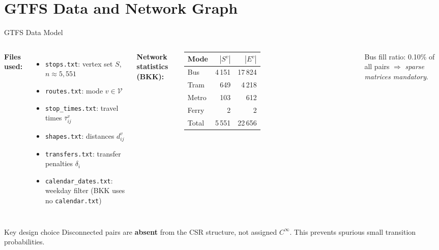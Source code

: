\documentclass[aspectratio=169,12pt]{beamer}
\begin{document}
\section{GTFS Data and Network Graph}
\begin{frame}{GTFS Data Model}
\begin{columns}[T]
\textbf{Files used:}
\begin{itemize}
  \item \texttt{stops.txt}: vertex set $S$, $n\approx5{,}551$
  \item \texttt{routes.txt}: mode $v\in\mathcal{V}$
  \item \texttt{stop\_times.txt}: travel times $\bar\tau^v_{ij}$
  \item \texttt{shapes.txt}: distances $d^v_{ij}$
  \item \texttt{transfers.txt}: transfer penalties $\delta_i$
  \item \texttt{calendar\_dates.txt}: weekday filter (BKK uses no \texttt{calendar.txt})
\end{itemize}

\textbf{Network statistics (BKK):}
\vspace{4pt}
\begin{tabular}{lrr}
\toprule
Mode & $|S^v|$ & $|E^v|$ \\
\midrule
Bus        & 4\,151 & 17\,824 \\
Tram       &   649  &  4\,218 \\
Metro      &   103  &    612  \\
Ferry      &     2  &      2  \\
\midrule
Total      & 5\,551 & 22\,656 \\
\bottomrule
\end{tabular}

\vspace{8pt}
Bus fill ratio: 0.10\% of all pairs $\Rightarrow$ \emph{sparse matrices mandatory}.
\end{columns}
\vspace{6pt}
\begin{alertblock}{Key design choice}
Disconnected pairs are \textbf{absent} from the CSR structure, not assigned $C^\infty$.
This prevents spurious small transition probabilities.
\end{alertblock}
\end{frame}
\end{document}
